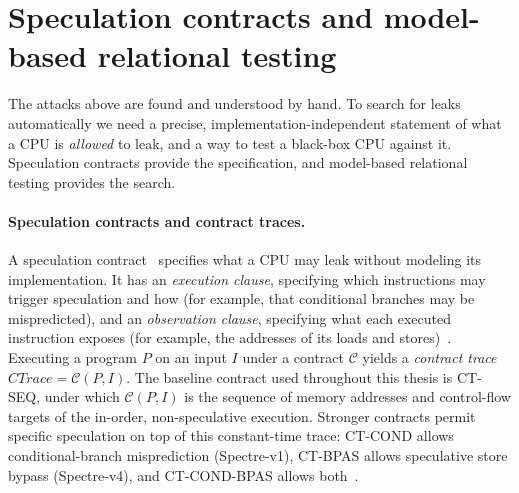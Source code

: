 \section{Speculation contracts and model-based relational testing}
\label{sec:bg-mrt}

The attacks above are found and understood by hand. To search for leaks automatically we need a
precise, implementation-independent statement of what a CPU is \emph{allowed} to leak, and a way
to test a black-box CPU against it. Speculation contracts provide the specification, and
model-based relational testing provides the search.

\paragraph{Speculation contracts and contract traces.}
A speculation contract~\cite{contracts} specifies what a CPU may leak without modeling its
implementation. It has an \emph{execution clause}, specifying which instructions may trigger
speculation and how (for example, that conditional branches may be mispredicted), and an
\emph{observation clause}, specifying what each executed instruction exposes (for example, the
addresses of its loads and stores)~\cite{revizor}. Executing a program $P$ on an input $I$ under a
contract $\mathcal{C}$ yields a \emph{contract trace} $\mathit{CTrace}=\mathcal{C}(P,I)$. The
baseline contract used throughout this thesis is \textsc{CT-SEQ}, under which $\mathcal{C}(P,I)$ is
the sequence of memory addresses and control-flow targets of the in-order, non-speculative
execution. Stronger contracts permit specific speculation on top of this constant-time trace:
\textsc{CT-COND} allows conditional-branch misprediction (Spectre-v1), \textsc{CT-BPAS} allows
speculative store bypass (Spectre-v4), and \textsc{CT-COND-BPAS} allows both~\cite{revizor,contracts}.

